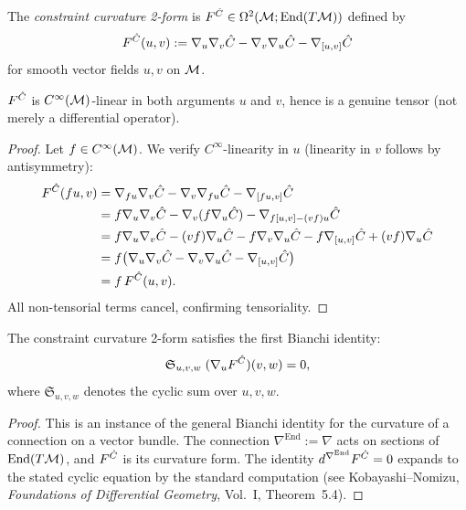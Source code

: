 \begin{definition}
\label{def:3.9}
The \emph{constraint curvature 2-form} is
$F^{\hat{C}} \in \Omega^2(\mathcal{M}; \mathrm{End}(T\mathcal{M}))$ defined by
\[
  F^{\hat{C}}(u, v) :=
    \nabla_u \nabla_v \hat{C}
    - \nabla_v \nabla_u \hat{C}
    - \nabla_{[u,v]} \hat{C}
\]
for smooth vector fields $u, v$ on $\mathcal{M}$.
\end{definition}

\begin{lemma}
\label{lem:3.3}
$F^{\hat{C}}$ is $C^\infty(\mathcal{M})$-linear in both arguments $u$ and $v$,
hence is a genuine tensor (not merely a differential operator).
\end{lemma}

\begin{proof}
Let $f \in C^\infty(\mathcal{M})$.  We verify $C^\infty$-linearity in $u$
(linearity in $v$ follows by antisymmetry):
\begin{align*}
  F^{\hat{C}}(fu, v)
  &= \nabla_{fu} \nabla_v \hat{C}
     - \nabla_v \nabla_{fu} \hat{C}
     - \nabla_{[fu,v]} \hat{C} \\
  &= f \nabla_u \nabla_v \hat{C}
     - \nabla_v (f \nabla_u \hat{C})
     - \nabla_{f[u,v] - (vf)u} \hat{C} \\
  &= f \nabla_u \nabla_v \hat{C}
     - (vf)\nabla_u \hat{C} - f\nabla_v \nabla_u \hat{C}
     - f\nabla_{[u,v]} \hat{C} + (vf)\nabla_u \hat{C} \\
  &= f\bigl(\nabla_u \nabla_v \hat{C}
     - \nabla_v \nabla_u \hat{C}
     - \nabla_{[u,v]} \hat{C}\bigr) \\
  &= f \, F^{\hat{C}}(u, v).
\end{align*}
All non-tensorial terms cancel, confirming tensoriality.
\end{proof}

\begin{proposition}
\label{prop:3.2}
The constraint curvature 2-form satisfies the first Bianchi identity:
\[
  \mathfrak{S}_{u,v,w}\;
  (\nabla_u F^{\hat{C}})(v, w) = 0,
\]
where $\mathfrak{S}_{u,v,w}$ denotes the cyclic sum over $u, v, w$.
\end{proposition}

\begin{proof}
This is an instance of the general Bianchi identity for the curvature
of a connection on a vector bundle.  The connection
$\nabla^{\mathrm{End}} := \nabla$ acts on sections of
$\mathrm{End}(T\mathcal{M})$, and $F^{\hat{C}}$ is its curvature form.  The
identity $d^{\nabla^{\mathrm{End}}} F^{\hat{C}} = 0$ expands to the
stated cyclic equation by the standard computation (see Kobayashi--Nomizu,
\textit{Foundations of Differential Geometry}, Vol.~I, Theorem~5.4).
\end{proof}

